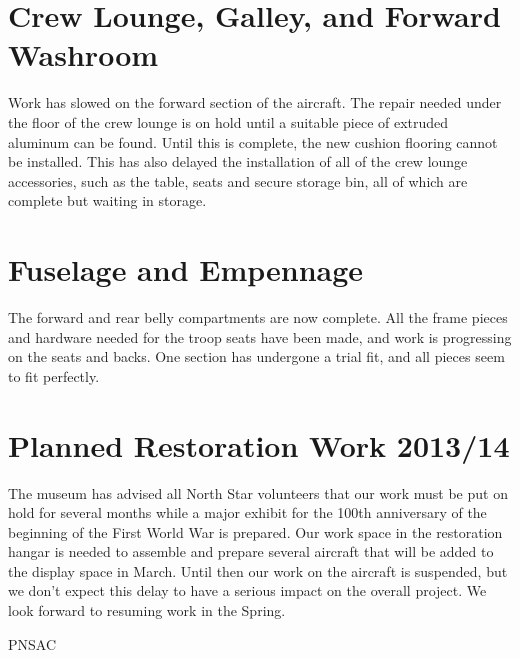 \section{Crew Lounge, Galley,  and Forward Washroom}
\label{crewlounge}

Work has slowed on the forward section of the aircraft.  The repair
needed under the floor of the crew lounge is on hold until a suitable
piece of extruded aluminum can be found.  Until this is complete, the
new cushion flooring cannot be installed. This has also delayed the
installation of all of the crew lounge accessories, such as the table,
seats and secure storage bin, all of which are complete but waiting in
storage.

\section{Fuselage and Empennage}
\label{empenage}

The forward and rear belly compartments are now complete.  All the
frame pieces and hardware needed for the troop seats have been made,
and work is progressing on the seats and backs.  One section has
undergone a trial fit, and all pieces seem to fit perfectly.

\section{Planned Restoration Work 2013/14}
\label{sec:plannedwork}

The museum has advised all North Star volunteers that our work must be
put on hold for several months while a major exhibit for the 100th
anniversary of the beginning of the First World War is prepared.  Our
work space in the restoration hangar is needed to assemble and prepare
several aircraft that will be added to the display space in March.
Until then our work on the aircraft is suspended, but we don't expect
this delay to have a serious impact on the overall project.  We look
forward to resuming work in the Spring.


\begin{footnotesize}
  \raggedleft PNSAC\\
\end{footnotesize}



